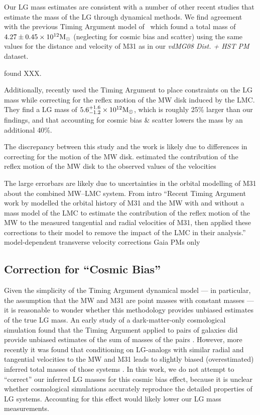 \documentclass[twocolumn]{aastex631}
\begin{document}
Our LG mass estimates are consistent with a number of other recent studies that
estimate the mass of the LG through dynamical methods. 
We find agreement with the previous Timing Argument model 
of~\cite{vdm2012} which found a total mass 
of $4.27\pm0.45\times 10^{12}\mathrm{M}_\odot$ (neglecting for cosmic bias and 
scatter) using the same values for the distance and velocity of 
M31 as in our \textit{vdMG08 Dist. + HST PM} dataset.

\cite{Zhai2020} found XXX. 


Additionally, \cite{Benisty2022} recently used the Timing Argument to place constraints on the
LG mass while correcting for the reflex motion of the MW disk induced by the LMC. They find a LG mass of 
$5.6^{+1.6}_{-1.2}\times10^{12}\mathrm{M}_\odot$, which is roughly 25\% larger than our findings, and that accounting for cosmic bias \& scatter lowers the mass by an additional 40\%. 

The discrepancy between this study and the \cite{Benisty2022} work is likely due to differences in correcting for the motion of the MW disk. \cite{Benisty2022} estimated the contribution of the reflex motion of the MW disk to the observed values of the  velocities


The large errorbars are likely due to uncertainties in the orbital modelling of
M31 about the combined MW--LMC system.
From intro ``Recent Timing Argument work by \cite{Benisty2022} modelled the orbital history
of M31 and the MW with and without a mass model of the LMC to estimate the
contribution of the reflex motion of the MW to the measured tangential and
radial velocities of M31, then applied these corrections to their model to 
remove the impact of the LMC in their analysis.''
model-dependent transverse velocity corrections
Gaia PMs only
 



\subsection{Correction for ``Cosmic Bias''}

Given the simplicity of the Timing Argument dynamical model --- in particular,
the assumption that the MW and M31 are point masses with constant masses --- it
is reasonable to wonder whether this methodology provides unbiased estimates of
the true LG mass.
An early study of a dark-matter-only cosmological simulation found that the
Timing Argument applied to pairs of galaxies did provide unbiased estimates of
the sum of masses of the pairs \citep{LiWhite2008}.
However, more recently it was found that conditioning on LG-analogs with similar
radial and tangential velocities to the MW and M31 leads to slightly biased
(overestimated) inferred total masses of those systems \citep{Gonzalez2014,
Hartl2021}.
In this work, we do not attempt to ``correct'' our inferred LG masses for this
cosmic bias effect, because it is unclear whether cosmological simulations
accurately reproduce the detailed properties of LG systems.
Accounting for this effect would likely lower our LG mass measurements.
\end{document}
